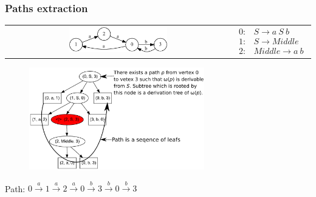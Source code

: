 \documentclass[xcolor=table]{beamer}
\begin{document}
\begin{frame}[fragile] \frametitle{Paths extraction}
\begin{center}
\begin{tabular}{  c  c  }
    \includegraphics[width=0.45\textwidth]{pictures/input.pdf}
    &
$

\begin{array}{rl}
   0:& S \rightarrow a \ S \ b \\
   1:& S \rightarrow Middle \\
   2:& Middle \rightarrow a \ b
\end{array}

$
\end{tabular}

\begin{figure}[ht]
    \centering
        \includegraphics[width=0.68\textwidth]{pictures/AnBn_2_m.pdf}
\end{figure}
Path: $0\xrightarrow{a}1\xrightarrow{a}2\xrightarrow{a}0\xrightarrow{b}3\xrightarrow{b}0\xrightarrow{b}3$
\end{center}
\end{frame}
\end{document}
